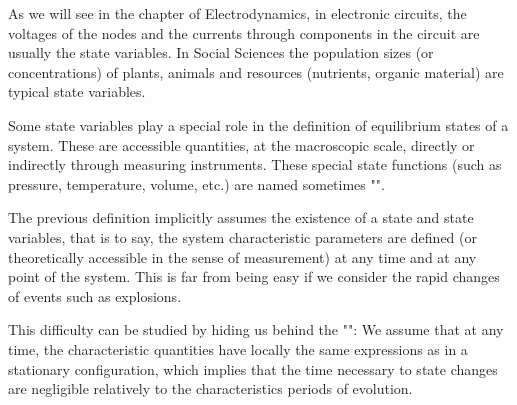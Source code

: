 	As we will see in the chapter of Electrodynamics, in electronic circuits, the voltages of the nodes and the currents through components in the circuit are usually the state variables. In Social Sciences the population sizes (or concentrations) of plants, animals and resources (nutrients, organic material) are typical state variables.
	\begin{tcolorbox}[title=Remark,colframe=black,arc=10pt]
	Some state variables play a special role in the definition of equilibrium states of a system. These are accessible quantities, at the macroscopic scale, directly or indirectly through measuring instruments. These special state functions (such as pressure, temperature, volume, etc.) are named sometimes "".
	\end{tcolorbox}
	The previous definition implicitly assumes the existence of a state and state variables, that is to say, the system characteristic parameters are defined (or theoretically accessible in the sense of measurement) at any time and at any point of the system. This is far from being easy if we consider the rapid changes of events such as explosions.
	
	This difficulty can be studied by hiding us behind the  "": We assume that at any time, the characteristic quantities have locally the same expressions as in a stationary configuration, which implies that the time necessary to state changes are negligible relatively to the characteristics periods of evolution.
	
